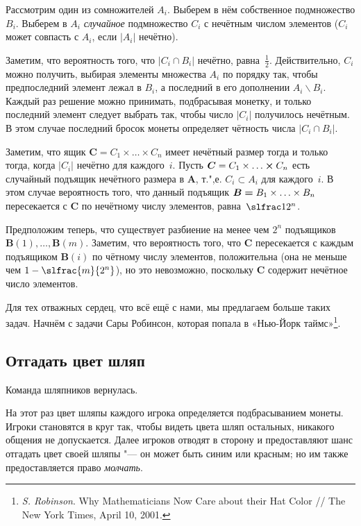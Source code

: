 \documentclass[twoside]{book}
\makeatletter
\newcommand{\rindex}[2][\imki@jobname]{%
  \index[#1]{\detokenize{#2}}%
}
\makeatother
\begin{document}
Рассмотрим один из сомножителей $A_i$. 
Выберем в нём собственное подмножество $B_i$.
Выберем в $A_i$ \emph{случайное} подмножество $C_i$ с нечётным числом элементов ($C_i$ может совпасть с $A_i$, если $|A_i|$ нечётно).

Заметим, что вероятность того, что $|C_i\cap B_i|$ нечётно, равна~$\tfrac12$.
Действительно, $C_i$ можно получить, выбирая элементы множества $A_i$ по порядку так, чтобы предпоследний элемент лежал в $B_i$, а последний в его дополнении $A_i\backslash B_i$.
Каждый раз решение можно принимать, подбрасывая монетку, и только последний элемент следует выбрать так, чтобы число $|C_i|$ получилось нечётным.
В этом случае последний бросок монеты определяет чётность числа $|C_i\cap B_i|$.

Заметим, что ящик $\bm{C}=C_1 \times\ldots\times C_n$ имеет нечётный размер тогда и только тогда, когда $|C_i|$ нечётно для каждого~$i$.
Пусть $\bm{C}=C_1 \times \ldots \hm\times C_n$ есть случайный подъящик нечётного размера в $\bm{A}$, т.",е. $C_i\subset A_i$ для каждого~$i$.
В этом случае вероятность того, что данный подъящик $\bm{B}\hm=B_1\times\ldots\times B_n$ пересекается с $\bm{C}$ по нечётному числу элементов, равна~$\slfrac1{2^n}$.

Предположим теперь, что существует разбиение на менее чем $2^n$ подъящиков $\bm{B}(1),\dots,\bm{B}(m)$.
Заметим, что вероятность того, что $\bm{C}$ пересекается с каждым подъящиком $\bm{B}(i)$ по чётному числу элементов, положительна (она не меньше чем $1-\slfrac{m}{2^n}$),
но это невозможно, поскольку $\bm{C}$ содержит нечётное число элементов.
\heart

Для тех отважных сердец, что всё ещё с нами, мы предлагаем больше таких задач.
Начнём с задачи Сары Робинсон, которая попала в «Нью-Йорк таймс»\footnote{\emph{S. Robinson}. Why Mathematicians Now Care about their Hat Color /\!/ {The New York Times}, April 10, 2001.}.

\subsection*{Отгадать цвет шляп}
\rindex{Отгадать цвет шляп}

Команда шляпников вернулась.

На этот раз цвет шляпы каждого игрока определяется подбрасыванием монеты.
Игроки становятся в круг так, чтобы видеть цвета шляп остальных, никакого общения не допускается.
Далее игроков отводят в сторону и предоставляют шанс отгадать цвет своей шляпы "--- он может быть синим или красным;
но им также предоставляется право \emph{молчать}.
\end{document}
